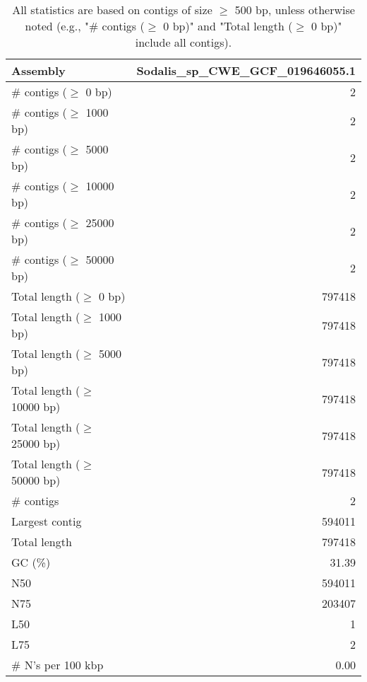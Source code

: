 \documentclass[12pt,a4paper]{article}
\begin{document}
\begin{table}[ht]
\begin{center}
\caption{All statistics are based on contigs of size $\geq$ 500 bp, unless otherwise noted (e.g., "\# contigs ($\geq$ 0 bp)" and "Total length ($\geq$ 0 bp)" include all contigs).}
\begin{tabular}{|l*{1}{|r}|}
\hline
Assembly & Sodalis\_sp\_CWE\_GCF\_019646055.1 \\ \hline
\# contigs ($\geq$ 0 bp) & 2 \\ \hline
\# contigs ($\geq$ 1000 bp) & 2 \\ \hline
\# contigs ($\geq$ 5000 bp) & 2 \\ \hline
\# contigs ($\geq$ 10000 bp) & 2 \\ \hline
\# contigs ($\geq$ 25000 bp) & 2 \\ \hline
\# contigs ($\geq$ 50000 bp) & 2 \\ \hline
Total length ($\geq$ 0 bp) & 797418 \\ \hline
Total length ($\geq$ 1000 bp) & 797418 \\ \hline
Total length ($\geq$ 5000 bp) & 797418 \\ \hline
Total length ($\geq$ 10000 bp) & 797418 \\ \hline
Total length ($\geq$ 25000 bp) & 797418 \\ \hline
Total length ($\geq$ 50000 bp) & 797418 \\ \hline
\# contigs & 2 \\ \hline
Largest contig & 594011 \\ \hline
Total length & 797418 \\ \hline
GC (\%) & 31.39 \\ \hline
N50 & 594011 \\ \hline
N75 & 203407 \\ \hline
L50 & 1 \\ \hline
L75 & 2 \\ \hline
\# N's per 100 kbp & 0.00 \\ \hline
\end{tabular}
\end{center}
\end{table}
\end{document}
